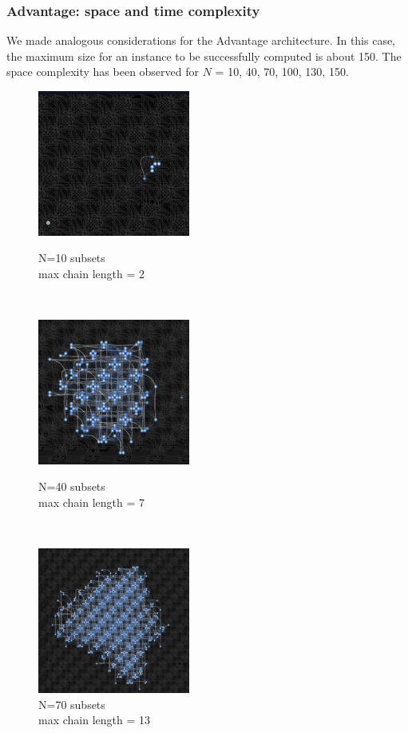 \documentclass[oneside,a4paper]{article}
\begin{document}
\subsubsection{Advantage: space and time complexity}

We made analogous considerations for the Advantage architecture. In this case, the maximum size for an instance to be successfully computed is about 150. The space complexity has been observed for $N$ = 10, 40, 70, 100, 130, 150.

\begin{figure}[htp]
\centering
\begin{minipage}[b]{4.5cm}

\includegraphics[width=5cm]{LaTeXTemplate/Images/Advantagefirst10.png}
\caption{N=10 subsets\\max chain length = 2}
\end{minipage}
\ \hspace{2mm} \hspace{2mm} \
\begin{minipage}[b]{4.5cm}

\includegraphics[width=5cm]{LaTeXTemplate/Images/Advantagefirst40.png}
\caption{N=40 subsets\\max chain length = 7}
\end{minipage}
\ \hspace{2mm} \hspace{2mm} \
\begin{minipage}[b]{4.5cm}
\centering
\includegraphics[width=5cm]{LaTeXTemplate/Images/Advantagefirst70.png}
\caption{N=70 subsets\\max chain length = 13}
\end{minipage}
\end{figure}
\end{document}
